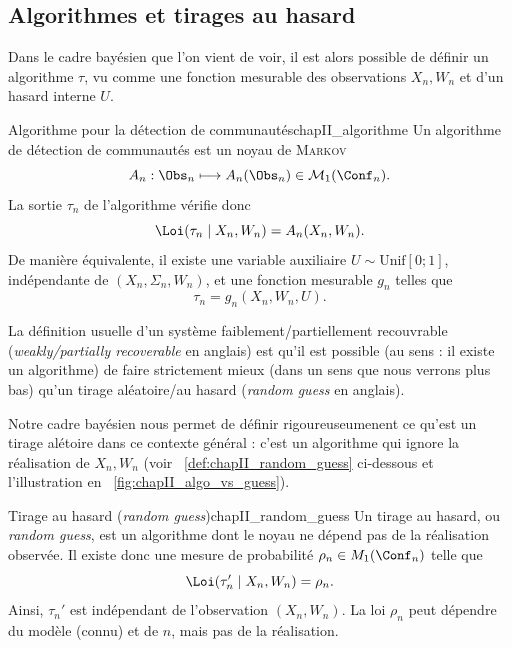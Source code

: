 \subsection{Algorithmes et tirages au hasard}

Dans le cadre bayésien que l'on vient de voir, il est alors possible de définir un algorithme $\tau$, vu comme une fonction mesurable des observations $X_n,W_n$ et d'un hasard interne $U$.

\begin{Definition}{Algorithme pour la détection de communautés}{chapII_algorithme}
Un algorithme de détection de communautés est un noyau de \textsc{Markov}
\[
    A_n:\Obs_n\longmapsto A_n(\Obs_n)\in \mathcal{M}_1(\Conf_n).
\]
La sortie $\tau_n$ de l'algorithme vérifie donc
\[
    \Loi(\tau_n\mid X_n,W_n)=A_n(X_n,W_n).
\]
De manière équivalente, il existe une variable auxiliaire $U\sim\mathrm{Unif}[0 ; 1]$, indépendante de $(X_n,\Sigma_n,W_n)$, et une fonction mesurable $g_n$ telles que
\[
    \tau_n=g_n(X_n,W_n,U).
\]
\end{Definition}

La définition usuelle d'un système faiblement/partiellement recouvrable (\emph{weakly/partially recoverable} en anglais) \cite{SankararamanBaccelli2018} est qu'il est possible (au sens : il existe un algorithme) de faire strictement mieux (dans un sens que nous verrons plus bas) qu'un tirage aléatoire/au hasard (\emph{random guess} en anglais).

Notre cadre bayésien nous permet de définir rigoureuseumenent ce qu'est un tirage alétoire dans ce contexte général : c'est un algorithme qui ignore la réalisation de $X_n, W_n$ (voir \Def~\ref{def:chapII_random_guess} ci-dessous et l'illustration en \Fig~\ref{fig:chapII_algo_vs_guess}).

\begin{Definition}{Tirage au hasard (\emph{random guess})}{chapII_random_guess}
Un tirage au hasard, ou \emph{random guess}, est un algorithme dont le noyau ne dépend pas de la réalisation observée. Il existe donc une mesure de probabilité $\rho_n\in\mathcal \mathcal{M}_1(\Conf_n)$ telle que
\[
    \Loi(\tau_n'\mid X_n,W_n)=\rho_n.
\]
Ainsi, $\tau_n'$ est indépendant de l'observation $(X_n,W_n)$. La loi $\rho_n$ peut dépendre du modèle (connu) et de $n$, mais pas de la réalisation.
\end{Definition}

